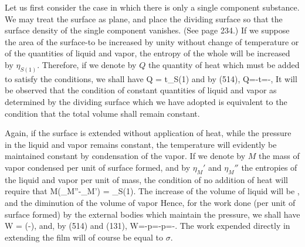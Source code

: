 \documentclass[12pt]{article}
\begin{document}
{Let us first consider the case in which there is only a single component substance.  We may treat the surface as plane, and place the dividing surface so that the surface density of the single component vanishes. (See page 234.) If we suppose the area of the surface-to be increased by unity without change of temperature or of the quantities of liquid and vapor, the entropy of the whole will be increased by $\eta_{S(1)}$. Therefore, if we denote by $Q$ the quantity of heat which must be added to satisfy the conditions, we shall have
\eqs Q = t\eta_{S(1)}   \label{586}  \eqe
and by (514),
\eqs Q=-t=-, \label{587} \eqe
It will be observed that the condition of constant quantities of liquid and vapor as determined by the dividing surface which we have adopted is equivalent to the condition that the total volume shall remain constant.

Again, if the surface is extended without application of heat, while the pressure in the liquid and vapor remains constant, the temperature will evidently be maintained constant by condensation of the vapor. If we denote by $M$ the mass of vapor condensed per unit of surface formed, and by $\eta_M'$ and $\eta_M''$ the entropies of the liquid and vapor per unit of mass, the condition of no addition of heat will require that
\eqs M(\eta_M''-\eta_M') = \eta_{S(1)}. \label{588} \eqe
The increase of the volume of liquid will be
\eqs {},\label{589} \eqe
and the diminution of the volume of vapor
\eqs {} \label{590} \eqe
Hence, for the work done (per unit of surface formed) by the external bodies which maintain the pressure, we shall have
\eqs W = \left(-\right), \label{591} \eqe
and, by (514) and (131),
\eqs W=-p=-p=-.     \label{592} \eqe
The work expended directly in extending the film will of course be equal to $\sigma$.

}
\end{document}
